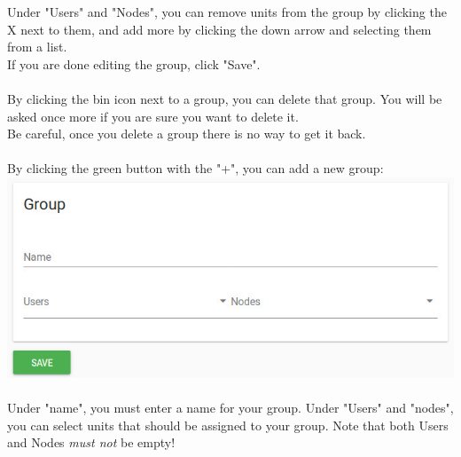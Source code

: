 \documentclass[twoside,a4paper]{refart}
\begin{document}
Under "Users" and "Nodes", you can remove units from the group by clicking the X next to them, and add more by clicking the down arrow and selecting them from a list. \\
If you are done editing the group, click "Save".\\ \\
By clicking the bin icon next to a group, you can delete that group. You will be asked once more if you are sure you want to delete it. \\
Be careful, once you delete a group there is no way to get it back. \\ \\
By clicking the green button with the "+", you can add a new group: \\
\includegraphics[width=\linewidth]{groupadd.jpeg} \\ \\
Under "name", you must enter a name for your group. Under "Users" and "nodes", you can select units that should be assigned to your group. Note that both Users and Nodes \emph{must not} be empty!
\end{document}
